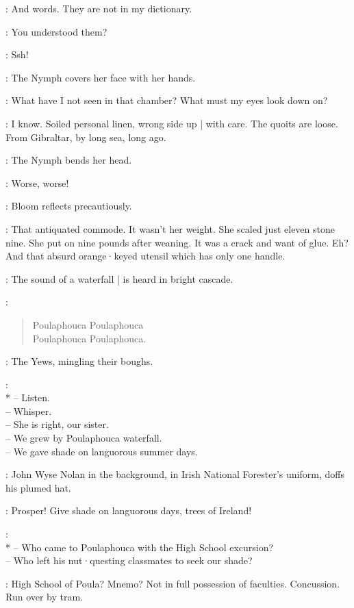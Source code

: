 \Nymph:
And words.
They are not in my dictionary.

\Bloom:
You understood them?

\Yews[3b]:
Ssh!

:
The Nymph covers her face with her hands.

\Nymph:
What have I not seen in that chamber?
What must my eyes look down on?

\Bloom:
I know.
Soiled personal linen,
wrong side up |
with care.
The quoits are loose.
From Gibraltar,
by long sea,
long ago.

:
The Nymph bends her head.

\Nymph:
Worse,
worse!

:
Bloom reflects precautiously.

\Bloom:
That antiquated commode.
It wasn't her weight.
She scaled just eleven stone nine.
She put on nine pounds after weaning.
It was a crack and want of glue.
Eh?
And that absurd orange·keyed utensil which has only one handle.

:
The sound of a waterfall |
is heard in bright cascade.

\Waterfall:
\begin{verse}
    Poulaphouca Poulaphouca\\
%
    Poulaphouca Poulaphouca.
\end{verse}

:
The Yews,
mingling their boughs.

\Yews:\\*
-- Listen.\\
-- Whisper.\\
-- She is right, our sister.\\
-- We grew by Poulaphouca waterfall.\\
-- We gave shade on languorous summer days.

:
John Wyse Nolan in the background,
in Irish National Forester's uniform,
doffs his plumed hat.

\JohnWyse:
Prosper!
Give shade on languorous days,
trees of Ireland!

\Yews:
\\*
-- Who came to Poulaphouca with the High School excursion?\\
-- Who left his nut·questing classmates to seek our shade?

\Bloom:
High School of Poula?
Mnemo?
Not in full possession of faculties.
Concussion.
Run over by tram.

